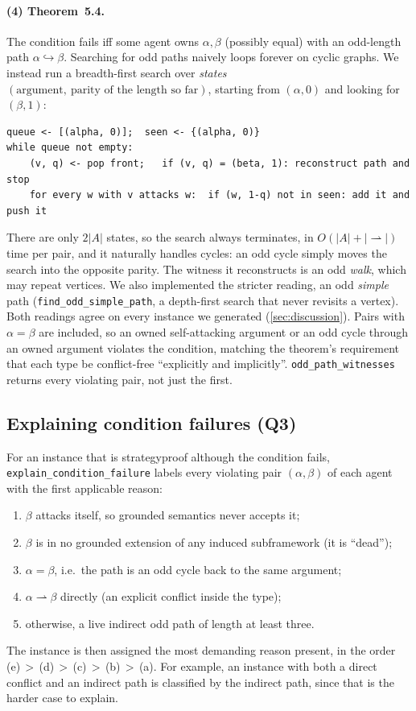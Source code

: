 \documentclass[11pt,a4paper]{article}
\newcommand{\att}{\rightharpoonup}
\newcommand{\odd}{\hookrightarrow}
\newcommand{\code}[1]{{\let\origus\_\renewcommand{\_}{\origus\allowbreak}\texttt{#1}}}
\theoremstyle{definition}
\begin{document}
\paragraph{(4) Theorem~5.4.} The condition fails iff some agent owns $\alpha,\beta$ (possibly equal)
with an odd-length path $\alpha\odd\beta$. Searching for odd paths naively loops forever on cyclic
graphs. We instead run a breadth-first search over \emph{states} $(\text{argument},\
\text{parity of the length so far})$, starting from $(\alpha,0)$ and looking for $(\beta,1)$:
\begin{lstlisting}
queue <- [(alpha, 0)];  seen <- {(alpha, 0)}
while queue not empty:
    (v, q) <- pop front;   if (v, q) = (beta, 1): reconstruct path and stop
    for every w with v attacks w:  if (w, 1-q) not in seen: add it and push it
\end{lstlisting}
There are only $2|A|$ states, so the search always terminates, in $O(|A|+|{\att}|)$ time per pair, and
it naturally handles cycles: an odd cycle simply moves the search into the opposite parity. The
witness it reconstructs is an odd \emph{walk}, which may repeat vertices. We also implemented the
stricter reading, an odd \emph{simple} path (\code{find\_odd\_simple\_path}, a depth-first search
that never revisits a vertex). Both readings agree on every instance we generated
(\cref{sec:discussion}). Pairs with $\alpha=\beta$ are included, so an owned self-attacking argument
or an odd cycle through an owned argument violates the condition, matching the theorem's requirement
that each type be conflict-free ``explicitly and implicitly''. \code{odd\_path\_witnesses} returns
every violating pair, not just the first.

\subsection{Explaining condition failures (Q3)}

For an instance that is strategyproof although the condition fails, \code{explain\_condition\_failure}
labels every violating pair $(\alpha,\beta)$ of each agent with the first applicable reason:
\begin{enumerate}[label=(\alph*)]
  \item $\beta$ attacks itself, so grounded semantics never accepts it;
  \item $\beta$ is in no grounded extension of any induced subframework (it is ``dead'');
  \item $\alpha=\beta$, i.e.\ the path is an odd cycle back to the same argument;
  \item $\alpha\att\beta$ directly (an explicit conflict inside the type);
  \item otherwise, a live indirect odd path of length at least three.
\end{enumerate}
The instance is then assigned the most demanding reason present, in the order
(e)\,$>$\,(d)\,$>$\,(c)\,$>$\,(b)\,$>$\,(a). For example, an instance with both a direct conflict and
an indirect path is classified by the indirect path, since that is the harder case to explain.
\end{document}
